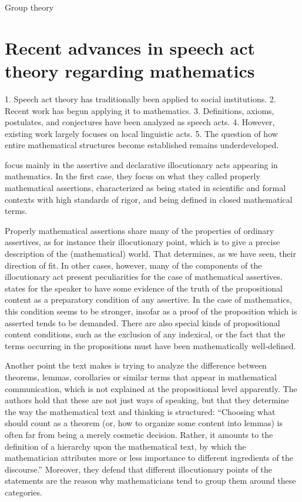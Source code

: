 \documentclass[11pt,a4paper]{article}
\begin{document}
Group theory 

\section{Recent advances in speech act theory regarding mathematics}

1. Speech act theory has traditionally been applied to social institutions.
2. Recent work has begun applying it to mathematics.
3. Definitions, axioms, postulates, and conjectures have been analyzed as speech acts.
4. However, existing work largely focuses on local linguistic acts.
5. The question of how entire mathematical structures become established remains underdeveloped.

\textcite{RuffinoEtAl2021} focus mainly in the assertive and declarative illocutionary acts appearing in mathematics. In the first case, they focus on what they called properly mathematical assertions, characterized as being stated in scientific and formal contexts with high standards of rigor, and being defined in closed mathematical terms.  

Properly mathematical assertions share many of the properties of ordinary assertives, as for instance their illocutionary point, which is to give a precise description of the (mathematical) world. That determines, as we have seen, their direction of fit. In other cases, however, many of the components of the illocutionary act present peculiarities for the case of mathematical assertives. \textcite[66]{searle1969} states for the speaker to have some evidence of the truth of the propositional content as a preparatory condition of any assertive. In the case of mathematics, this condition seems to be stronger, insofar as a proof of the proposition which is asserted tends to be demanded. There are also special kinds of propositional content conditions, such as the exclusion of any indexical, or the fact that the terms occurring in the propositions must have been mathematically well-defined.

Another point the text makes is trying to analyze the difference between theorems, lemmas, corollaries or similar terms that appear in mathematical communication, which is not explained at the propositional level apparently. The authors hold that these are not just ways of speaking, but that they determine the way the mathematical text and thinking is structured: “Choosing what should count as a theorem (or, how to organize some content into lemmas) is often far from being a merely cosmetic decision. Rather, it amounts to the definition of a hierarchy upon the mathematical text, by which the mathematician attributes more or less importance to different ingredients of the discourse.” Moreover, they defend that different illocutionary points of the statements are the reason why mathematicians tend to group them around these categories.
\end{document}
